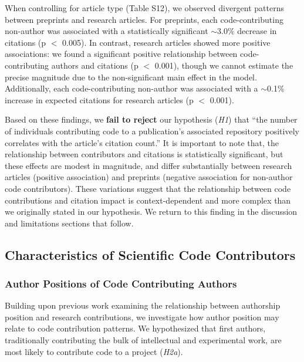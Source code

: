 \documentclass[
  number,
  3p,
  onecolumn]{elsarticle}
\begin{document}
When controlling for article type (Table S12), we observed divergent
patterns between preprints and research articles. For preprints, each
code-contributing non-author was associated with a statistically
significant $\sim$3.0\% decrease in citations (p $<$
0.005). In contrast, research articles showed more positive
associations: we found a significant positive relationship between
code-contributing authors and citations (p $<$ 0.001), though we
cannot estimate the precise magnitude due to the non-significant main
effect in the model. Additionally, each code-contributing non-author was
associated with a $\sim$0.1\% increase in expected citations
for research articles (p $<$ 0.001).

Based on these findings, we \textbf{fail to reject} our hypothesis
(\emph{H1}) that ``the number of individuals contributing code to a
publication's associated repository positively correlates with the
article's citation count.'' It is important to note that, the
relationship between contributors and citations is statistically
significant, but these effects are modest in magnitude, and differ
substantially between research articles (positive association) and
preprints (negative association for non-author code contributors). These
variations suggest that the relationship between code contributions and
citation impact is context-dependent and more complex than we originally
stated in our hypothesis. We return to this finding in the discussion
and limitations sections that follow.

\subsection{Characteristics of Scientific Code
Contributors}\label{characteristics-of-scientific-code-contributors}

\subsubsection{Author Positions of Code Contributing
Authors}\label{author-positions-of-code-contributing-authors}

Building upon previous work examining the relationship between
authorship position and research contributions, we investigate how
author position may relate to code contribution patterns. We
hypothesized that first authors, traditionally contributing the bulk of
intellectual and experimental work, are most likely to contribute code
to a project (\emph{H2a}).
\end{document}
